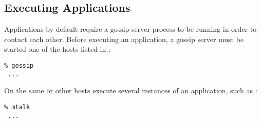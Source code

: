 \subsection{Executing Applications}
Applications by default require a gossip server process to be running
in order to contact each other.  Before executing an application, a
gossip server must be started one of the hosts listed in
:
\begin{verbatim}
% gossip
 ...
\end{verbatim}
On the same or other hosts execute several instances of an
application, such as :
\begin{verbatim}
% mtalk
 ...
\end{verbatim}

